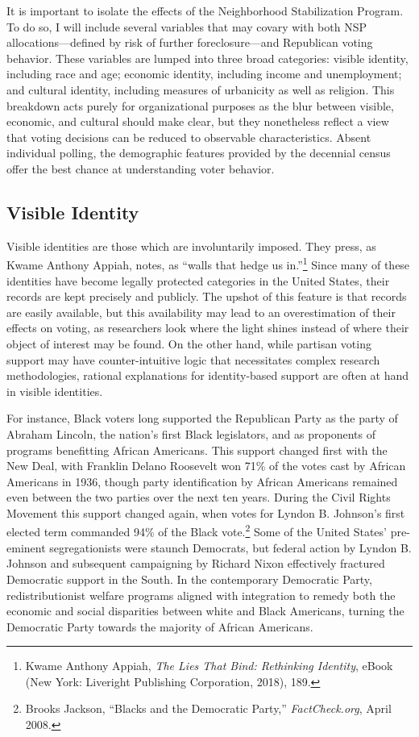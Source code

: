 \documentclass[12pt,oneside]{psthesis}
\begin{document}
It is important to isolate the effects of the Neighborhood Stabilization Program.
To do so, I will include several variables that may covary with both NSP allocations---defined by risk of further foreclosure---and Republican voting behavior.
These variables are lumped into three broad categories: visible identity, including race and age; economic identity, including income and unemployment; and cultural identity, including measures of urbanicity as well as religion.
This breakdown acts purely for organizational purposes as the blur between visible, economic, and cultural should make clear, but they nonetheless reflect a view that voting decisions can be reduced to observable characteristics.
Absent individual polling, the demographic features provided by the decennial census offer the best chance at understanding voter behavior.

\hypertarget{visible-identity}{%
\subsection{Visible Identity}\label{visible-identity}}

Visible identities are those which are involuntarily imposed.
They press, as Kwame Anthony Appiah, notes, as ``walls that hedge us in.''\footnote{Kwame Anthony Appiah, \emph{The Lies That Bind: Rethinking Identity}, eBook (New York: Liveright Publishing Corporation, 2018), 189.}
Since many of these identities have become legally protected categories in the United States, their records are kept precisely and publicly.
The upshot of this feature is that records are easily available, but this availability may lead to an overestimation of their effects on voting, as researchers look where the light shines instead of where their object of interest may be found.
On the other hand, while partisan voting support may have counter-intuitive logic that necessitates complex research methodologies, rational explanations for identity-based support are often at hand in visible identities.

For instance, Black voters long supported the Republican Party as the party of Abraham Lincoln, the nation's first Black legislators, and as proponents of programs benefitting African Americans.
This support changed first with the New Deal, with Franklin Delano Roosevelt won 71\% of the votes cast by African Americans in 1936, though party identification by African Americans remained even between the two parties over the next ten years.
During the Civil Rights Movement this support changed again, when votes for Lyndon B. Johnson's first elected term commanded 94\% of the Black vote.\footnote{Brooks Jackson, ``Blacks and the Democratic Party,'' \emph{FactCheck.org}, April 2008.}
Some of the United States' pre-eminent segregationists were staunch Democrats, but federal action by Lyndon B. Johnson and subsequent campaigning by Richard Nixon effectively fractured Democratic support in the South.
In the contemporary Democratic Party, redistributionist welfare programs aligned with integration to remedy both the economic and social disparities between white and Black Americans, turning the Democratic Party towards the majority of African Americans.
\end{document}
